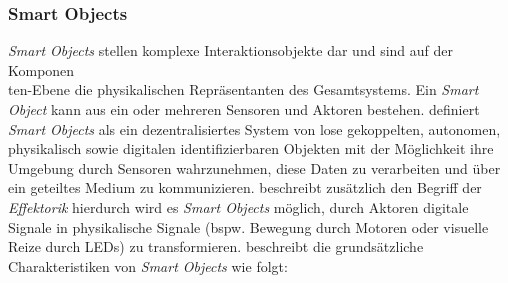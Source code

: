 \subsubsection{Smart Objects}
\textit{Smart Objects} stellen komplexe Interaktionsobjekte dar und sind auf der Komponen\\ten-Ebene die physikalischen Repräsentanten des Gesamtsystems. Ein \textit{Smart Object} kann aus ein oder mehreren Sensoren und Aktoren bestehen. \cite{Kortuem2010Smart} definiert \textit{Smart Objects} als ein dezentralisiertes System von lose gekoppelten, autonomen, physikalisch sowie digitalen identifizierbaren Objekten mit der Möglichkeit ihre Umgebung durch Sensoren wahrzunehmen, diese Daten zu verarbeiten und über ein geteiltes Medium zu kommunizieren. \cite{mattern2010internet} beschreibt zusätzlich den Begriff der \textit{Effektorik} hierdurch wird es \textit{Smart Objects} möglich, durch Aktoren digitale Signale in  physikalische Signale (bspw. Bewegung durch Motoren oder visuelle Reize durch LEDs) zu transformieren. \cite{Kortuem2010Smart} beschreibt die grundsätzliche Charakteristiken von \textit{Smart Objects} wie folgt:
